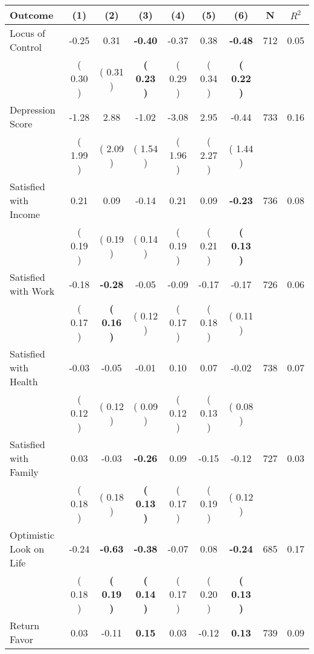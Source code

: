\begin{tabular}{lcccccccc}
\toprule
 \textbf{Outcome} & \textbf{(1)} & \textbf{(2)} & \textbf{(3)} & \textbf{(4)} & \textbf{(5)} & \textbf{(6)} & \textbf{N} & \textbf{$ R^2$} \\
\midrule
Locus of Control &     -0.25 &      0.31 & \textbf{    -0.40} &     -0.37 &      0.38 & \textbf{    -0.48} & 712 &       0.05 \\ 
 & (     0.30 ) & (     0.31 ) & \textbf{(     0.23 )} & (     0.29 ) & (     0.34 ) & \textbf{(     0.22 )} & \\
Depression Score &     -1.28 &      2.88 &     -1.02 &     -3.08 &      2.95 &     -0.44 & 733 &       0.16 \\ 
 & (     1.99 ) & (     2.09 ) & (     1.54 ) & (     1.96 ) & (     2.27 ) & (     1.44 ) & \\
Satisfied with Income &      0.21 &      0.09 &     -0.14 &      0.21 &      0.09 & \textbf{    -0.23} & 736 &       0.08 \\ 
 & (     0.19 ) & (     0.19 ) & (     0.14 ) & (     0.19 ) & (     0.21 ) & \textbf{(     0.13 )} & \\
Satisfied with Work &     -0.18 & \textbf{    -0.28} &     -0.05 &     -0.09 &     -0.17 &     -0.17 & 726 &       0.06 \\ 
 & (     0.17 ) & \textbf{(     0.16 )} & (     0.12 ) & (     0.17 ) & (     0.18 ) & (     0.11 ) & \\
Satisfied with Health &     -0.03 &     -0.05 &     -0.01 &      0.10 &      0.07 &     -0.02 & 738 &       0.07 \\ 
 & (     0.12 ) & (     0.12 ) & (     0.09 ) & (     0.12 ) & (     0.13 ) & (     0.08 ) & \\
Satisfied with Family &      0.03 &     -0.03 & \textbf{    -0.26} &      0.09 &     -0.15 &     -0.12 & 727 &       0.03 \\ 
 & (     0.18 ) & (     0.18 ) & \textbf{(     0.13 )} & (     0.17 ) & (     0.19 ) & (     0.12 ) & \\
Optimistic Look on Life &     -0.24 & \textbf{    -0.63} & \textbf{    -0.38} &     -0.07 &      0.08 & \textbf{    -0.24} & 685 &       0.17 \\ 
 & (     0.18 ) & \textbf{(     0.19 )} & \textbf{(     0.14 )} & (     0.17 ) & (     0.20 ) & \textbf{(     0.13 )} & \\
Return Favor &      0.03 &     -0.11 & \textbf{     0.15} &      0.03 &     -0.12 & \textbf{     0.13} & 739 &       0.09 \\ 

\end{tabular}
